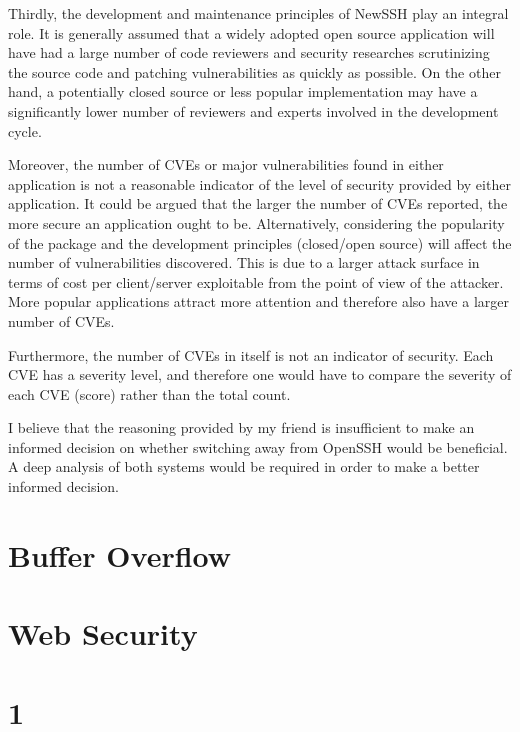 \documentclass[a4paper, 12pt]{article}
\begin{document}
Thirdly, the development and maintenance principles of NewSSH play an integral role. It is generally assumed that a widely adopted open source application will have had a large number of code reviewers and security researches scrutinizing the source code and patching vulnerabilities as quickly as possible. On the other hand, a potentially closed source or less popular implementation may have a significantly lower number of reviewers and experts involved in the development cycle.

Moreover, the number of CVEs or major vulnerabilities found in either application is not a reasonable indicator of the level of security provided by either application. It could be argued that the larger the number of CVEs reported, the more secure an application ought to be. Alternatively, considering the popularity of the package and the development principles (closed/open source) will affect the number of vulnerabilities discovered. This is due to a larger attack surface in terms of cost per client/server exploitable from the point of view of the attacker. More popular applications attract more attention and therefore also have a larger number of CVEs.

Furthermore, the number of CVEs in itself is not an indicator of security. Each CVE has a severity level, and therefore one would have to compare the severity of each CVE (score) rather than the total count.

I believe that the reasoning provided by my friend is insufficient to make an informed decision on whether switching away from OpenSSH would be beneficial. A deep analysis of both systems would be required in order to make a better informed decision.

\newpage
\section*{Buffer Overflow}
\setcounter{section}{1}

\newpage
\section*{Web Security}
\setcounter{section}{1}

\section*{1}


\newpage


\end{document}
